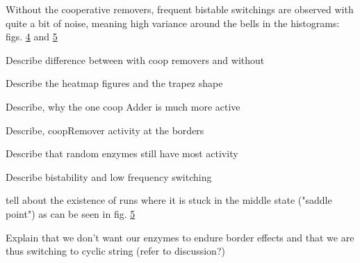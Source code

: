         \begin{figure}[htpb!]
            \centering
            \caption{}
            \label{img:nonCyclBistability_runPlot}
        \end{figure}
        \begin{figure}[htpb!]
            \centering
            \caption{}
            \label{img:nonCyclBistability_bindingNumbers}
        \end{figure}
        \begin{figure}[htpb!]
            \centering
            \caption{}
            \label{img:nonCyclBistability_bindingTimeDuration}
        \end{figure}
        Without the cooperative removers, frequent bistable switchings are observed with quite a bit of noise, meaning high variance around the bells in the histograms: figs. \ref{img:nonCyclBistability_runPlot2} and \ref{img:nonCyclBistability_runPlot3}
        \begin{figure}[htpb!]
            \centering
            \caption{}
            \label{img:nonCyclBistability_runPlot2}
        \end{figure}
        \begin{figure}[htpb!]
            \centering
            \caption{}
            \label{img:nonCyclBistability_runPlot3}
        \end{figure}
        \begin{itemize}
            {
                \color{red}
                \item Describe difference between with coop removers and without
                \item Describe the heatmap figures and the trapez shape
                \item Describe, why the one coop Adder is much more active
                \item Describe, coopRemover activity at the borders
                \item Describe that random enzymes still have most activity
                \item Describe bistability and low frequency switching
                \item tell about the existence of runs where it is stuck in the middle state ("saddle point") as can be seen in fig. \ref{img:nonCyclBistability_runPlot3}
                \item Explain that we don't want our enzymes to endure border effects and that we are thus switching to cyclic string (refer to discussion?)
            }
        \end{itemize}
    \newpage
